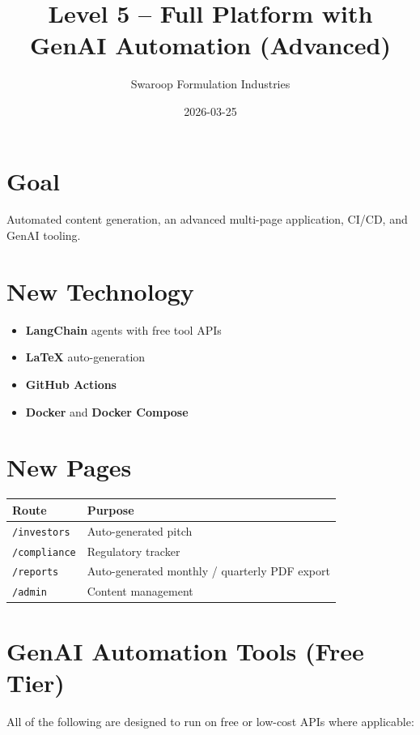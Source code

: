 \documentclass{article}
\title{Level 5 -- Full Platform with GenAI Automation (Advanced)}
\author{Swaroop Formulation Industries}
\date{2026-03-25}
\begin{document}
\maketitle

\section{Goal}

Automated content generation, an advanced multi-page application, CI/CD, and GenAI tooling.

\section{New Technology}

\begin{itemize}[leftmargin=*]
  \item \textbf{LangChain} agents with free tool APIs
  \item \textbf{LaTeX} auto-generation
  \item \textbf{GitHub Actions}
  \item \textbf{Docker} and \textbf{Docker Compose}
\end{itemize}

\section{New Pages}

\begin{center}
\begin{tabular}{@{}ll@{}}
\toprule
\textbf{Route} & \textbf{Purpose} \\
\midrule
\texttt{/investors} & Auto-generated pitch \\
\texttt{/compliance} & Regulatory tracker \\
\texttt{/reports} & Auto-generated monthly / quarterly PDF export \\
\texttt{/admin} & Content management \\
\bottomrule
\end{tabular}
\end{center}

\section{GenAI Automation Tools (Free Tier)}

All of the following are designed to run on free or low-cost APIs where applicable:
\end{document}
